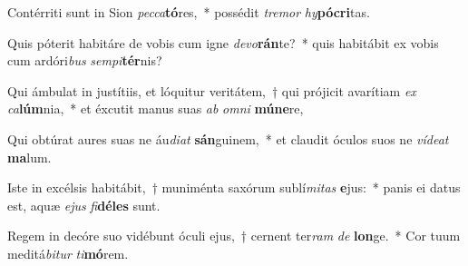 \item Contérriti sunt in Sion \textit{pec}\textit{ca}\textbf{tó}res,~* possédit \textit{tre}\textit{mor} \textit{hy}\textbf{pó}\textbf{cri}tas.
\item Quis póterit habitáre de vobis cum igne \textit{de}\textit{vo}\textbf{rán}te?~* quis habitábit ex vobis cum ardóri\textit{bus} \textit{sem}\textit{pi}\textbf{tér}nis?
\item Qui ámbulat in justítiis, et lóquitur veritátem,~† qui prójicit avarítiam \textit{ex} \textit{ca}\textbf{lúm}nia,~* et éxcutit manus suas \textit{ab} \textit{om}\textit{ni} \textbf{mú}\textbf{ne}re,
\item Qui obtúrat aures suas ne áu\textit{di}\textit{at} \textbf{sán}guinem,~* et claudit óculos suos ne \textit{ví}\textit{de}\textit{at} \textbf{ma}lum.
\item Iste in excélsis habitábit,~† muniménta saxórum sublí\textit{mi}\textit{tas} \textbf{e}jus:~* panis ei datus est, aquæ \textit{e}\textit{jus} \textit{fi}\textbf{dé}\textbf{les} sunt.
\item Regem in decóre suo vidébunt óculi ejus,~† cernent ter\textit{ram} \textit{de} \textbf{lon}ge.~* Cor tuum meditá\textit{bi}\textit{tur} \textit{ti}\textbf{mó}rem.
